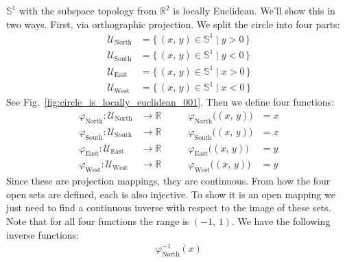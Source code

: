 \documentclass{article}
\theoremstyle{plain}
\theoremstyle{normal}
\newenvironment{example}{%
    \pushQED{\qed}\renewcommand{\qedsymbol}{$\blacksquare$}\examplex%
}{%
    \popQED\endexamplex%
}
\begin{document}
        \begin{example}
            $\mathbb{S}^{1}$ with the subspace topology from $\mathbb{R}^{2}$
            is locally Euclidean. We'll show this in two ways. First, via
            orthographic projection. We split the circle into four parts:
            \begin{align}
                \mathcal{U}_{\textrm{North}}
                &=\{\,(x,\,y)\in\mathbb{S}^{1}\;|\;y>0\,\}\\
                \mathcal{U}_{\textrm{South}}
                &=\{\,(x,\,y)\in\mathbb{S}^{1}\;|\;y<0\,\}\\
                \mathcal{U}_{\textrm{East}}
                &=\{\,(x,\,y)\in\mathbb{S}^{1}\;|\;x>0\,\}\\
                \mathcal{U}_{\textrm{West}}
                &=\{\,(x,\,y)\in\mathbb{S}^{1}\;|\;x<0\,\}
            \end{align}
            See Fig.~\ref{fig:circle_is_locally_euclidean_001}.
            Then we define four functions:
            \begin{align}
                \varphi_{\textrm{North}}:
                \mathcal{U}_{\textrm{North}}&\rightarrow\mathbb{R}&
                \quad\quad
                \varphi_{\textrm{North}}\big((x,\,y)\big)&=x\\
                \varphi_{\textrm{South}}:
                \mathcal{U}_{\textrm{South}}&\rightarrow\mathbb{R}&
                \quad\quad
                \varphi_{\textrm{South}}\big((x,\,y)\big)&=x\\
                \varphi_{\textrm{East}}:
                \mathcal{U}_{\textrm{East}}&\rightarrow\mathbb{R}&
                \quad\quad
                \varphi_{\textrm{East}}\big((x,\,y)\big)&=y\\
                \varphi_{\textrm{West}}:
                \mathcal{U}_{\textrm{West}}&\rightarrow\mathbb{R}&
                \quad\quad
                \varphi_{\textrm{West}}\big((x,\,y)\big)&=y
            \end{align}
            Since these are projection mappings, they are continuous. From
            how the four open sets are defined, each is also injective. To
            show it is an open mapping we just need to find a continuous
            inverse with respect to the image of these sets. Note that for all
            four functions the range is $(-1,\,1)$. We have the following
            inverse functions:
            \begin{align}
                \varphi_{\textrm{North}}^{-1}(x)

\end{align}
\end{example}
\end{document}
